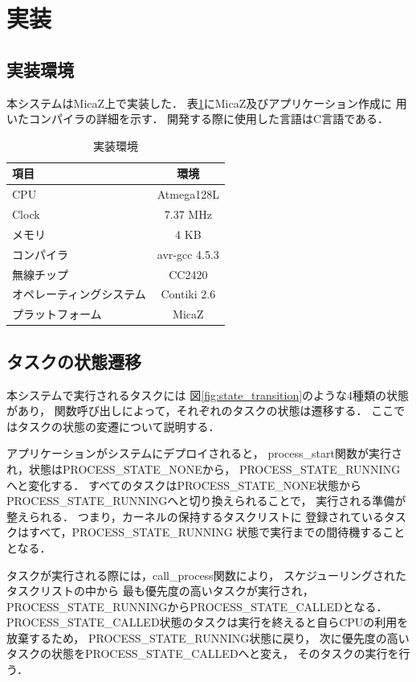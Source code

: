 \section{実装}
\subsection{実装環境}\label{sec:implement_env}
本システムはMicaZ上で実装した．
表\ref{tab:implementation_env}にMicaZ及びアプリケーション作成に
用いたコンパイラの詳細を示す．
開発する際に使用した言語はC言語である．


\begin{table}[htb]
  \centering
  \caption{実装環境}
  \begin{tabular}{|l||c|} \hline
  	項目	 & 環境 \\ \hline \hline
	CPU & Atmega128L \\ \hline
	Clock	& 7.37 MHz \\ \hline
	メモリ & 4 KB \\ \hline
	コンパイラ	& avr-gcc 4.5.3 \\ \hline
	無線チップ	& CC2420 \\ \hline
	オペレーティングシステム & Contiki 2.6 \\ \hline
	プラットフォーム & MicaZ \\ \hline
  \end{tabular}
  \label{tab:implementation_env}
\end{table}



\subsection{タスクの状態遷移}
本システムで実行されるタスクには
図\ref{fig:state_transition}のような4種類の状態があり，
関数呼び出しによって，それぞれのタスクの状態は遷移する．
ここではタスクの状態の変遷について説明する．

アプリケーションがシステムにデプロイされると，
process\_start関数が実行され，状態はPROCESS\_STATE\_NONEから，
PROCESS\_STATE\_RUNNINGへと変化する．
すべてのタスクはPROCESS\_STATE\_NONE状態から
PROCESS\_STATE\_RUNNINGへと切り換えられることで，
実行される準備が整えられる．
つまり，カーネルの保持するタスクリストに
登録されているタスクはすべて，PROCESS\_STATE\_RUNNING
状態で実行までの間待機することとなる．

タスクが実行される際には，call\_process関数により，
スケジューリングされたタスクリストの中から
最も優先度の高いタスクが実行され，
PROCESS\_STATE\_RUNNINGからPROCESS\_STATE\_CALLEDとなる．
PROCESS\_STATE\_CALLED状態のタスクは実行を終えると自らCPUの利用を放棄するため，
PROCESS\_STATE\_RUNNING状態に戻り，
次に優先度の高いタスクの状態をPROCESS\_STATE\_CALLEDへと変え，
そのタスクの実行を行う．

